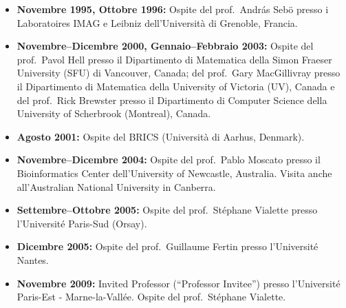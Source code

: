    \begin{itemize}
\vspace{-4.0mm}
      \item[] {\bf Novembre 1995, Ottobre 1996:} 
            Ospite
            del prof.~Andr\'{a}s Seb\"o
            presso i Laboratoires
            IMAG %
            e Leibniz
            dell'Universit\`a di Grenoble, Francia.
      \item[] {\bf Novembre--Dicembre 2000, Gennaio--Febbraio 2003:} 
            Ospite
            del prof.~Pavol Hell
            presso il Dipartimento di Matematica
            della Simon Fraeser University (SFU)
            di Vancouver, Canada;
            del prof.~Gary MacGillivray
            presso il Dipartimento di Matematica
            della University of Victoria (UV), Canada
            e del prof.~Rick Brewster
            presso il Dipartimento di Computer Science
            della University of Scherbrook (Montreal), Canada.
      \item[] {\bf Agosto 2001:}
            Ospite del BRICS (Universit\`a di Aarhus, Denmark).
      \item[] {\bf Novembre--Dicembre 2004:} 
            Ospite
            del prof.~Pablo Moscato
            presso il Bioinformatics Center
            dell'University of Newcastle, Australia.
            Visita anche all'Australian National University in Canberra.
      \item[] {\bf Settembre--Ottobre 2005:} 
            Ospite
            del prof.~St\'ephane Vialette
            presso l'Universit\'e Paris-Sud (Orsay).
      \item[] {\bf Dicembre 2005:} 
            Ospite
            del prof.~Guillaume Fertin
            presso l'Universit\'e Nantes.
      \item[] {\bf Novembre 2009:}
            Invited Professor (“Professor Invitee”) 
            presso l'Universit\'e Paris-Est - Marne-la-Vall\'ee.
            Ospite del prof.~St\'ephane Vialette.

\end{itemize}
